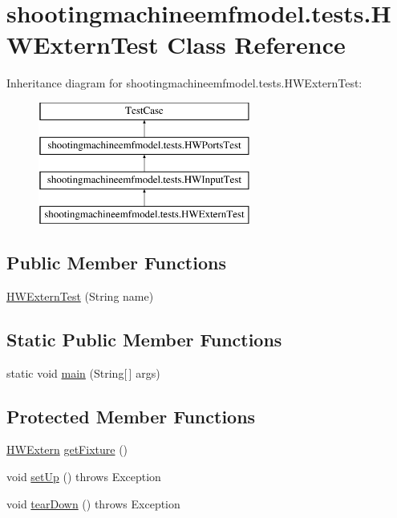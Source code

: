 \hypertarget{classshootingmachineemfmodel_1_1tests_1_1_h_w_extern_test}{\section{shootingmachineemfmodel.\-tests.\-H\-W\-Extern\-Test Class Reference}
\label{classshootingmachineemfmodel_1_1tests_1_1_h_w_extern_test}
}
Inheritance diagram for shootingmachineemfmodel.\-tests.\-H\-W\-Extern\-Test\-:\begin{figure}[H]
\begin{center}
\leavevmode
\includegraphics[height=4.000000cm]{classshootingmachineemfmodel_1_1tests_1_1_h_w_extern_test}
\end{center}
\end{figure}
\subsection*{Public Member Functions}
\begin{DoxyCompactItemize}
\item 
\hyperlink{classshootingmachineemfmodel_1_1tests_1_1_h_w_extern_test_a6ecb10af9985de52d204d3bc414c4de9}{H\-W\-Extern\-Test} (String name)
\end{DoxyCompactItemize}
\subsection*{Static Public Member Functions}
\begin{DoxyCompactItemize}
\item 
static void \hyperlink{classshootingmachineemfmodel_1_1tests_1_1_h_w_extern_test_ad38dbfe6a45b04f9b68b63a64595d8b8}{main} (String\mbox{[}$\,$\mbox{]} args)
\end{DoxyCompactItemize}
\subsection*{Protected Member Functions}
\begin{DoxyCompactItemize}
\item 
\hyperlink{interfaceshootingmachineemfmodel_1_1_h_w_extern}{H\-W\-Extern} \hyperlink{classshootingmachineemfmodel_1_1tests_1_1_h_w_extern_test_a93a662a5d0c1a76ac240624845e77988}{get\-Fixture} ()
\item 
void \hyperlink{classshootingmachineemfmodel_1_1tests_1_1_h_w_extern_test_a5db23a4d6e3cc281eb3a7df1e9f37097}{set\-Up} ()  throws Exception 
\item 
void \hyperlink{classshootingmachineemfmodel_1_1tests_1_1_h_w_extern_test_a9a6cf6d7b53d1390378a77a4bec8f575}{tear\-Down} ()  throws Exception 
\end{DoxyCompactItemize}
